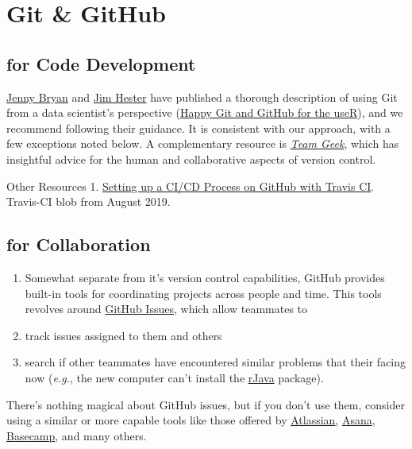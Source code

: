 \documentclass[
]{book}
\begin{document}
\hypertarget{appendix-appendix}{%
\appendix}


\hypertarget{git-github}{%
\chapter{Git \& GitHub}\label{git-github}}

\hypertarget{for-code-development}{%
\section{for Code Development}\label{for-code-development}}

\href{https://github.com/jennybc}{Jenny Bryan} and \href{https://github.com/jimhester}{Jim Hester} have published a thorough description of using Git from a data scientist's perspective (\href{https://happygitwithr.com/}{Happy Git and GitHub for the useR}), and we recommend following their guidance. It is consistent with our approach, with a few exceptions noted below. A complementary resource is \emph{\href{https://smile.amazon.com/dp/1449302440}{Team Geek}}, which has insightful advice for the human and collaborative aspects of version control.

Other Resources
1. \href{https://blog.travis-ci.com/2019-05-30-setting-up-a-ci-cd-process-on-github}{Setting up a CI/CD Process on GitHub with Travis CI}. Travis-CI blob from August 2019.

\hypertarget{for-collaboration}{%
\section{for Collaboration}\label{for-collaboration}}

\begin{enumerate}
\def\labelenumi{\arabic{enumi}.}
\item
  Somewhat separate from it's version control capabilities, GitHub provides built-in tools for coordinating projects across people and time. This tools revolves around \href{https://guides.github.com/features/issues/}{GitHub Issues}, which allow teammates to
\item
  track issues assigned to them and others
\item
  search if other teammates have encountered similar problems that their facing now (\emph{e.g.}, the new computer can't install the \href{https://CRAN.R-project.org/package=rJava}{rJava} package).
\end{enumerate}

There's nothing magical about GitHub issues, but if you don't use them, consider using a similar or more capable tools like those offered by \href{https://www.atlassian.com/}{Atlassian}, \href{https://asana.com/}{Asana}, \href{https://basecamp.com/}{Basecamp}, and many others.
\end{document}
